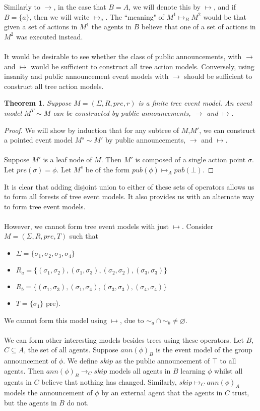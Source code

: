 \documentclass[12pt, a4paper, titlepage]{article}
\newtheorem{thm}{Theorem}[subsection]
\numberwithin{equation}{section}
\newcommand{\FIXME}{{\bf FIXME}}
\begin{document}
Similarly to $\to$, in the case that $B = A$, we will denote this by $\mapsto$, and if $B = \{a\}$, then
we will write $\mapsto_a$.
The ``meaning" of $M^1 \mapsto_B M^2$ would be that given a set of actions in
$M^1$ the agents in $B$ believe that one of a set of actions in $M^2$ was
executed instead.\\
\\
It would be desirable to see whether the class of public announcements, with
$\to$ and $\mapsto$ would be sufficient to construct all tree action
models.
Conversely, using insanity and public announcement event models with $\to$ should be sufficient to construct
all tree action models.
\begin{thm}
Suppose $M = (\Sigma, R, pre, r)$ is a finite tree event model.
An event model $M^T \sim M$ can be constructed by public announcements, $\to$ and
$\mapsto$.
\end{thm}
\begin{proof}
We will show by induction that for any subtree of $M$,$M'$, we can construct a pointed event model
$M^s \sim M'$ by public announcements, $\to$ and $\mapsto$.\\
\\
Suppose $M'$ is a leaf node of $M$.
Then $M'$ is composed of a single action point $\sigma$.
Let $pre(\sigma) = \phi$.
Let $M^s$ be of the form $pub(\phi) \mapsto_A pub(\bot)$.
\end{proof}
It is clear that adding disjoint union to either of these sets of operators
allows us to form all forests of tree event models.
It also provides us with an alternate way to form tree event models.\\
\\
However, we cannot form tree event models with just $\mapsto$.
Consider $M = (\Sigma, R, pre, T)$ such that
\begin{itemize}
	\item $\Sigma = \{\sigma_1, \sigma_2, \sigma_3, \sigma_4\}$
	\item $R_a =
\{(\sigma_1,\sigma_2),(\sigma_1,\sigma_3),(\sigma_2,\sigma_2),(\sigma_3,\sigma_3)\}$
	\item $R_b = \{(\sigma_1,\sigma_3),(\sigma_1,\sigma_4),(\sigma_3,\sigma_3),(\sigma_4,\sigma_4)\}$
	\item $T = \{ \sigma_1 \}$
pre).
\end{itemize}
We cannot form this model using $ \mapsto $, due to $\sim_a \cap \sim_b \neq
\varnothing$.\\
\\
We can form other interesting models besides trees using these operators.
Let $B$, $C \subseteq A$, the set of all agents.
Suppose $ann(\phi)_B$ is the event model of the group announcement of $\phi$.
We define $skip$ as the public announcement of $\top$ to all agents.
Then $ann(\phi)_B \to_C skip$ models all agents in $B$ learning $\phi$ whilst all agents in $C$
believe that nothing has changed.
Similarly, $skip \mapsto_C ann(\phi)_A$ models the announcement of $\phi$ by an external agent that
the agents in $C$ trust, but the agents in $B$ do not.\\
\\
\end{document}
